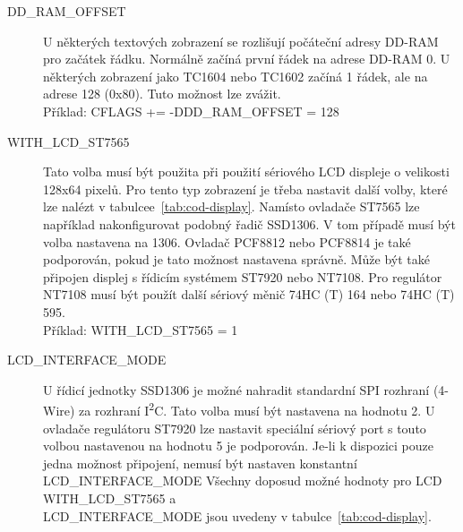 \begin{description}
  \item[DD\_RAM\_OFFSET] U některých textových zobrazení se rozlišují počáteční adresy DD-RAM pro začátek řádku. Normálně začíná první řádek na adrese DD-RAM 0.
U některých zobrazení jako TC1604 nebo TC1602 začíná 1 řádek, ale na adrese 128 (0x80).
Tuto možnost lze zvážit.\\
Příklad: CFLAGS += -DDD\_RAM\_OFFSET = 128

  \item[WITH\_LCD\_ST7565] Tato volba musí být použita při použití sériového LCD displeje o velikosti 128x64 pixelů.
Pro tento typ zobrazení je třeba nastavit další volby, které lze nalézt v tabulcee~\ref{tab:cod-display}.
Namísto ovladače ST7565 lze například nakonfigurovat podobný řadič SSD1306.
V tom případě musí být volba nastavena na 1306.
Ovladač PCF8812 nebo PCF8814 je také podporován, pokud je tato možnost nastavena správně.
Může být také připojen displej s řídicím systémem ST7920 nebo NT7108.
Pro regulátor NT7108 musí být použít další sériový měnič 74HC (T) 164 nebo 74HC (T) 595.\\
Příklad: WITH\_LCD\_ST7565 = 1 

 \item[LCD\_INTERFACE\_MODE] U řídicí jednotky SSD1306 je možné nahradit standardní 
SPI rozhraní (4-Wire) za rozhraní I\textsuperscript{2}C.
Tato volba musí být nastavena na hodnotu 2.
U ovladače regulátoru ST7920 lze nastavit speciální sériový port s touto volbou nastavenou
na hodnotu 5 je podporován.
Je-li k dispozici pouze jedna možnost připojení, nemusí být nastaven konstantní LCD\_INTERFACE\_MODE 
Všechny doposud možné hodnoty pro LCD \\ WITH\_LCD\_ST7565 a\\ LCD\_INTERFACE\_MODE jsou
uvedeny v tabulce~\ref{tab:cod-display}.


\end{description}

